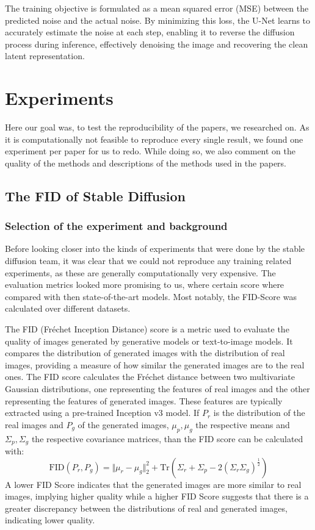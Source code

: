 \documentclass[11pt]{article}
\begin{document}
The training objective is formulated as a mean squared error (MSE) between the predicted noise and the actual noise. By minimizing this loss, the U-Net learns to accurately estimate the noise at each step, enabling it to reverse the diffusion process during inference, effectively denoising the image and recovering the clean latent representation.





\newpage
\section{Experiments}
Here our goal was, to test the reproducibility of the papers, we researched on. As it is computationally not feasible to reproduce every single result, we found one experiment per paper for us to redo. While doing so, we also comment on the quality of the methods and descriptions of the methods used in the papers.

\subsection{The FID of Stable Diffusion}
\subsubsection{Selection of the experiment and background}
\label{sec:experiments:stabel_diffusion:selction_of_fid}
Before looking closer into the kinds of experiments that were done by the stable diffusion team, it was clear that we could not reproduce any training related experiments, as these are generally computationally very expensive. The evaluation metrics looked more promising to us, where certain score where compared with then state-of-the-art models. Most notably, the FID-Score was calculated over different datasets.

The FID (Fréchet Inception Distance)\cite{heusel2018ganstrainedtimescaleupdate} score is a metric used to evaluate the quality of images generated by generative models or text-to-image models. It compares the distribution of generated images with the distribution of real images, providing a measure of how similar the generated images are to the real ones. The FID score calculates the Fréchet distance between two multivariate Gaussian distributions, one representing the features of real images and the other representing the features of generated images. These features are typically extracted using a pre-trained Inception v3 model. If $P_r$ is the distribution of the real images and $P_g$ of the generated images, $\mu_p, \mu_g$ the respective means and $\Sigma_p, \Sigma_g$ the respective covariance matrices, than the FID score can be calculated with:
$$\mathrm{FID}(P_r, P_g) = \Vert\mu_r - \mu_g\Vert_2^2 + \mathrm{Tr}\left(\Sigma_r + \Sigma_p - 2 (\Sigma_r\Sigma_g)^\frac{1}{2}\right)$$
A lower FID Score indicates that the generated images are more similar to real images, implying higher quality while a higher FID Score suggests that there is a greater discrepancy between the distributions of real and generated images, indicating lower quality.
\end{document}
